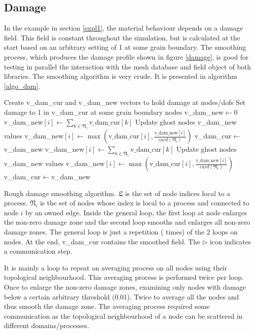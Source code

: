 \documentclass[12pt]{article}
\begin{document}
\subsection{Damage\label{mat_dam}}
In the example in section \ref{expl1}, the material behaviour depends on a damage field. This field is constant throughout the simulation, but is calculated at the start based on an arbitrary setting of 1 at some grain boundary. The smoothing process, which produces the damage profile shown in figure \ref{damage}, is good for testing in parallel the interaction with the mesh database and field object of both libraries. The smoothing algorithm is very crude. It is presented in algorithm \ref{algo_dam}.
\begin{algorithm}[h]
\footnotesize
\begin{algorithmic}
	\State Create v\_dam\_cur and v\_dam\_new vectors to hold damage at nodes/dofs%
	\State Set damage to 1 in v\_dam\_cur at some grain boundary nodes
	\State v\_dam\_new$\gets 0$
	\State v\_dam\_new$[i]\gets \displaystyle\sum_{k\in \mathfrak{N}_i}\text{v\_dam\_cur}[k]$
	\State Update ghost nodes v\_dam\_new values \Comment{~}
	\State v\_dam\_new$[i]\gets \max \left( \text{v\_dam\_cur}[i],\frac{\text{v\_dam\_new}[i]}{card\left(\mathfrak{N}_i\right)} \right)$
	\EndIf
	\EndFor
	\State v\_dam\_cur$\gets$v\_dam\_new
	\State v\_dam\_new$[i]\gets \displaystyle\sum_{k\in \mathfrak{N}_i}\text{v\_dam\_cur}[k]$
	\State Update ghost nodes v\_dam\_new values \Comment{~}
	\State v\_dam\_new$[i]\gets \max \left( \text{v\_dam\_cur}[i],\frac{\text{v\_dam\_new}[i]}{card\left(\mathfrak{N}_i\right)} \right)$
	\EndFor
	\State v\_dam\_cur$\gets$v\_dam\_new
	
	\EndFor
\end{algorithmic}
\caption{Rough damage smoothing algorithm. $\mathfrak{L}$ is the set of node indices local to a process. $\mathfrak{N}_i$ is the set of nodes whose index is local to a process and connected to node $i$ by an owned edge. Inside the general loop, the first loop at node enlarges the non-zero damage zone and the second loop smooths and enlarges all non-zero damage zones. The general loop is just a repetition ( times) of the 2 loops on nodes. At the end, v\_dam\_cur contains the smoothed field. The $\triangleright$ icon indicates a communication step.\label{algo_dam}}
\end{algorithm}
It is mainly a loop to repeat an averaging process on all nodes using their topological neighbourhood. This averaging process is performed twice per loop. Once to enlarge the non-zero damage zones, examining only nodes with damage below a certain arbitrary threshold (0.01). Twice to average all the nodes and thus smooth the damage zone.
The averaging process required some communication as the topological neighbourhood of a node can be scattered in different domains/processes.
\end{document}

